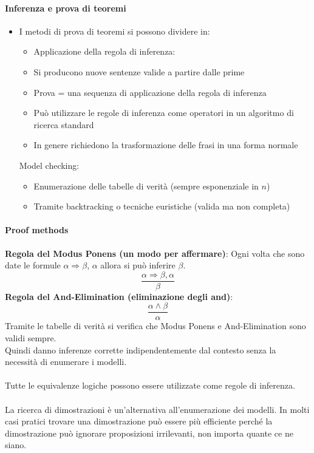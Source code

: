 \documentclass[../main.tex]{subfiles}
\begin{document}
	\paragraph{Inferenza e prova di teoremi}
	\begin{itemize}
		\item I metodi di prova di teoremi si possono dividere in:
		\begin{itemize}
			\item Applicazione della regola di inferenza:
			\item Si producono nuove sentenze valide a partire dalle prime
			\item Prova = una sequenza di applicazione della regola di inferenza
			\item Può utilizzare le regole di inferenza come operatori in un algoritmo di ricerca standard
			\item In genere richiedono la trasformazione delle frasi in una forma normale
		\end{itemize}
		Model checking:
		\begin{itemize}
			\item Enumerazione delle tabelle di verità (sempre esponenziale in $n$)
			\item Tramite backtracking o tecniche euristiche (valida ma non completa)
		\end{itemize}
	\end{itemize}
	\paragraph{Proof methods}
	\textbf{Regola del Modus Ponens (un modo per affermare)}: Ogni volta che sono date le formule $\alpha \Rightarrow \beta$, $\alpha$ allora si può inferire $\beta$.
	\[\frac{\alpha \Rightarrow \beta , \alpha}{\beta}\]
	\textbf{Regola del And-Elimination (eliminazione degli and)}:
	\[\frac{\alpha \wedge \beta}{\alpha}\]
	Tramite le tabelle di verità si verifica che Modus Ponens e And-Elimination sono validi sempre.\\
	Quindi danno inferenze corrette indipendentemente dal contesto senza la necessità di enumerare i modelli.\\\\
	Tutte le equivalenze logiche possono essere utilizzate come regole di inferenza.\\\\
	La ricerca di dimostrazioni è un'alternativa all'enumerazione dei modelli. In molti casi pratici trovare una dimostrazione può essere più efficiente perché la dimostrazione può ignorare proposizioni irrilevanti, non importa quante ce ne siano.
\end{document}
